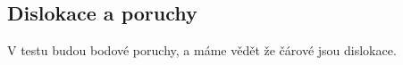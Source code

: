 \documentclass[../main.tex]{subfiles}
\begin{document}
\subsection{Dislokace a poruchy}

V testu budou bodové poruchy, a máme vědět že čárové jsou dislokace.
\end{document}
